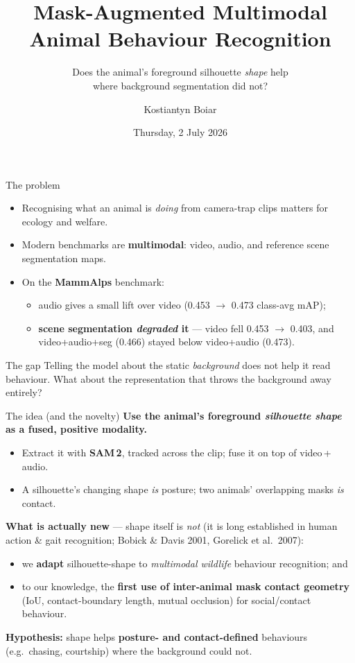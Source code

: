 \documentclass[aspectratio=169,11pt]{beamer}
\title[Mask-Augmented Behaviour Recognition]{Mask-Augmented Multimodal\\ Animal Behaviour Recognition}
\subtitle{Does the animal's foreground silhouette \emph{shape} help\\ where background segmentation did not?}
\author{Kostiantyn Boiar}
\institute{MSc Dissertation, University of Glasgow \\ Supervisor: Dr Marwa Mahmoud}
\date{Thursday, 2 July 2026}
\begin{document}
\begin{frame}[plain]
  \titlepage
\end{frame}

\begin{frame}{The problem}
  \begin{itemize}
    \item Recognising what an animal is \emph{doing} from camera-trap clips matters for
          ecology and welfare.
    \item Modern benchmarks are \textbf{multimodal}: video, audio, and reference scene
          segmentation maps.
    \item On the \textbf{MammAlps} benchmark:
      \begin{itemize}
        \item audio gives a small lift over video (0.453 $\to$ 0.473 class-avg mAP);
        \item \textbf{scene segmentation \emph{degraded} it} --- video fell 0.453 $\to$
              0.403, and video+audio+seg (0.466) stayed below video+audio (0.473).
      \end{itemize}
  \end{itemize}
  \vfill
  \begin{block}{The gap}
    Telling the model about the static \emph{background} does not help it read behaviour.
    What about the representation that throws the background away entirely?
  \end{block}
\end{frame}

\begin{frame}{The idea (and the novelty)}
  \textbf{Use the animal's foreground \emph{silhouette shape} as a fused, positive modality.}
  \begin{itemize}
    \item Extract it with \textbf{SAM\,2}, tracked across the clip; fuse it on top of
          video\,+\,audio.
    \item A silhouette's changing shape \emph{is} posture; two animals' overlapping masks
          \emph{is} contact.
  \end{itemize}
  \vfill
  \textbf{What is actually new} --- shape itself is \emph{not} (it is long established in
  human action \& gait recognition; Bobick \& Davis 2001, Gorelick et al.\ 2007):
  \begin{itemize}
    \item we \textbf{adapt} silhouette-shape to \emph{multimodal wildlife} behaviour
          recognition; and
    \item to our knowledge, the \textbf{first use of inter-animal mask contact geometry}
          (IoU, contact-boundary length, mutual occlusion) for social/contact behaviour.
  \end{itemize}
  \vfill
  \textbf{Hypothesis:} shape helps \textbf{posture- and contact-defined} behaviours
  (e.g.\ chasing, courtship) where the background could not.
\end{frame}
\end{document}
